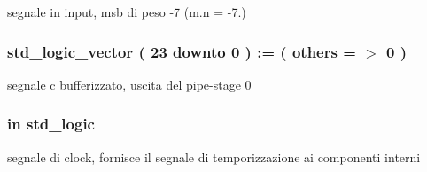 segnale in input, msb di peso -\/7 (m.\+n = -\/7.) 

\subsubsection[{\texorpdfstring{c\+\_\+buff0}{c_buff0}}]{ {\bfseries \textcolor{vhdlchar}{std\+\_\+logic\+\_\+vector}\textcolor{vhdlchar}{ }\textcolor{vhdlchar}{(}\textcolor{vhdlchar}{ }\textcolor{vhdlchar}{ } \textcolor{vhdldigit}{23} \textcolor{vhdlchar}{ }\textcolor{vhdlchar}{downto}\textcolor{vhdlchar}{ }\textcolor{vhdlchar}{ } \textcolor{vhdldigit}{0} \textcolor{vhdlchar}{ }\textcolor{vhdlchar}{)}\textcolor{vhdlchar}{ }\textcolor{vhdlchar}{ }\textcolor{vhdlchar}{ }\textcolor{vhdlchar}{\+:}\textcolor{vhdlchar}{=}\textcolor{vhdlchar}{ }\textcolor{vhdlchar}{(}\textcolor{vhdlchar}{ }\textcolor{vhdlchar}{ }\textcolor{vhdlchar}{others}\textcolor{vhdlchar}{ }\textcolor{vhdlchar}{ }\textcolor{vhdlchar}{=}\textcolor{vhdlchar}{ }\textcolor{vhdlchar}{$>$}\textcolor{vhdlchar}{ }\textcolor{vhdlchar}{\textquotesingle{}}\textcolor{vhdlchar}{ } \textcolor{vhdldigit}{0} \textcolor{vhdlchar}{ }\textcolor{vhdlchar}{\textquotesingle{}}\textcolor{vhdlchar}{ }\textcolor{vhdlchar}{)}\textcolor{vhdlchar}{ }} \hspace{0.3cm}{\ttfamily [Signal]}}\hypertarget{group___linear_regression_ga41b9aecdd19c390ca6c709455261ebab}{}\label{group___linear_regression_ga41b9aecdd19c390ca6c709455261ebab}


segnale c bufferizzato, uscita del pipe-\/stage 0 

\subsubsection[{\texorpdfstring{clk}{clk}}]{ {\bfseries \textcolor{vhdlchar}{in}\textcolor{vhdlchar}{ }} {\bfseries \textcolor{vhdlchar}{std\+\_\+logic}\textcolor{vhdlchar}{ }} \hspace{0.3cm}{\ttfamily [Port]}}\hypertarget{group___linear_regression_ga4a4609c199d30b3adebbeb3a01276ec5}{}\label{group___linear_regression_ga4a4609c199d30b3adebbeb3a01276ec5}


segnale di clock, fornisce il segnale di temporizzazione ai componenti interni 

